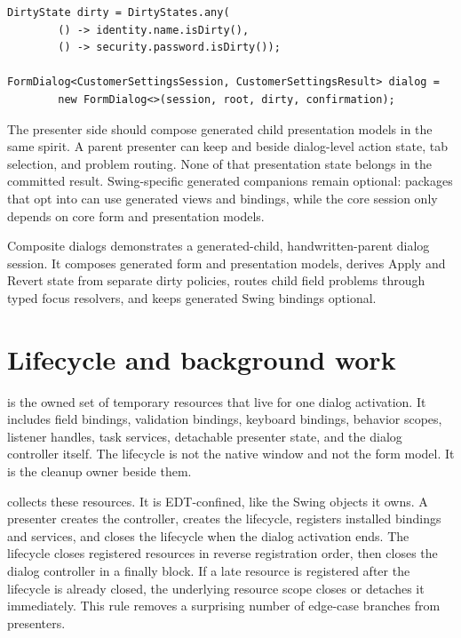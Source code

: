 \begin{lstlisting}[caption={The dialog sees one form model.}]
DirtyState dirty = DirtyStates.any(
        () -> identity.name.isDirty(),
        () -> security.password.isDirty());

FormDialog<CustomerSettingsSession, CustomerSettingsResult> dialog =
        new FormDialog<>(session, root, dirty, confirmation);
\end{lstlisting}

The presenter side should compose generated child presentation models in the
same spirit. A parent presenter can keep 
and  beside dialog-level action state,
tab selection, and problem routing. None of that presentation state belongs in
the committed result. Swing-specific generated companions remain optional:
packages that opt into  can use generated views and
bindings, while the core session only depends on core form and presentation
models.

\begin{examplebox}{Composite dialogs}
\multiFormDialogExample{} demonstrates a generated-child, handwritten-parent
dialog session. It composes generated form and presentation models, derives
Apply and Revert state from separate dirty policies, routes child field
problems through typed focus resolvers, and keeps generated Swing bindings
optional.
\end{examplebox}

\section{Lifecycle and background work}

 is the owned set of temporary
resources that live for one dialog activation. It includes field bindings,
validation bindings, keyboard bindings, behavior scopes, listener handles, task
services, detachable presenter state, and the dialog controller itself. The
lifecycle is not the native window and not the form model. It is the cleanup
owner beside them.

 collects these resources. It is EDT-confined, like
the Swing objects it owns. A presenter creates the controller, creates the
lifecycle, registers installed bindings and services, and closes the lifecycle
when the dialog activation ends. The lifecycle closes registered resources in
reverse registration order, then closes the dialog controller in a finally
block. If a late resource is registered after the lifecycle is already closed,
the underlying resource scope closes or detaches it immediately. This rule
removes a surprising number of edge-case branches from presenters.


